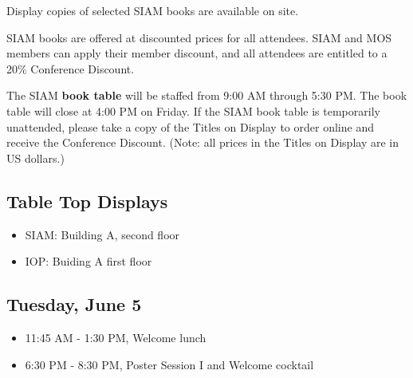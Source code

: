 
\noindent Display copies of selected SIAM books are available on site. 

\bigskip

\noindent SIAM books are offered at discounted prices for all attendees. 
SIAM and MOS members can apply their member discount, and all attendees are entitled to a 20\% Conference Discount. 

\bigskip

\noindent The SIAM \textbf{book table} will be staffed from 9:00 AM through 5:30 PM. 
The book table will close at 4:00 PM on Friday. 
If the SIAM book table is temporarily unattended, please take a copy of the Titles on Display to order online and receive the Conference Discount. 
(Note: all prices in the Titles on Display are in US dollars.)   

\subsection*{Table Top Displays}

\begin{itemize}
  \item SIAM: Building A, second floor
  \item IOP: Buiding A first floor
\end{itemize}


\subsection*{Tuesday, June 5}

\begin{itemize}
  \item[] 11:45 AM - 1:30 PM, Welcome lunch
  \item[] 6:30 PM - 8:30 PM, Poster Session I and Welcome cocktail
\end{itemize}


